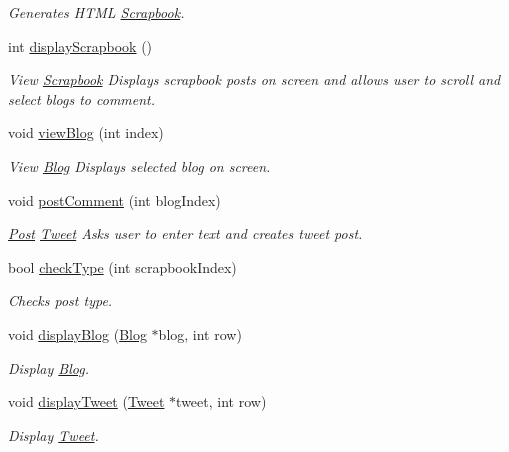 \begin{DoxyCompactItemize}
\begin{DoxyCompactList}\small\item\em Generates H\+T\+ML \hyperlink{classScrapbook}{Scrapbook}. \end{DoxyCompactList}\item 
int \hyperlink{classScrapbookUI_a4059c771a66d1f7f89a889397e546911}{display\+Scrapbook} ()
\begin{DoxyCompactList}\small\item\em View \hyperlink{classScrapbook}{Scrapbook} Displays scrapbook posts on screen and allows user to scroll and select blogs to comment. \end{DoxyCompactList}\item 
void \hyperlink{classScrapbookUI_a66f6c3b392e8b93fd93e5029e36e163c}{view\+Blog} (int index)
\begin{DoxyCompactList}\small\item\em View \hyperlink{classBlog}{Blog} Displays selected blog on screen. \end{DoxyCompactList}\item 
void \hyperlink{classScrapbookUI_ae1b8a9cd10ac8eac41b8c692e87af526}{post\+Comment} (int blog\+Index)\hypertarget{classScrapbookUI_ae1b8a9cd10ac8eac41b8c692e87af526}{}\label{classScrapbookUI_ae1b8a9cd10ac8eac41b8c692e87af526}

\begin{DoxyCompactList}\small\item\em \hyperlink{classPost}{Post} \hyperlink{classTweet}{Tweet} Asks user to enter text and creates tweet post. \end{DoxyCompactList}\item 
bool \hyperlink{classScrapbookUI_a465587d61bb66c1ac8c8c2c1b0b9a73d}{check\+Type} (int scrapbook\+Index)
\begin{DoxyCompactList}\small\item\em Checks post type. \end{DoxyCompactList}\item 
void \hyperlink{classScrapbookUI_a6c7d5e84abea60efb67d296c5545cb67}{display\+Blog} (\hyperlink{classBlog}{Blog} $\ast$blog, int row)
\begin{DoxyCompactList}\small\item\em Display \hyperlink{classBlog}{Blog}. \end{DoxyCompactList}\item 
void \hyperlink{classScrapbookUI_ad6944e17044fe124baae5d647b46ffef}{display\+Tweet} (\hyperlink{classTweet}{Tweet} $\ast$tweet, int row)
\begin{DoxyCompactList}\small\item\em Display \hyperlink{classTweet}{Tweet}. \end{DoxyCompactList}\end{DoxyCompactItemize}
